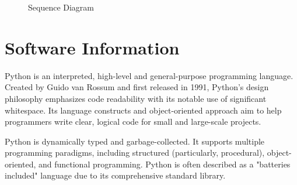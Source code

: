\documentclass[oneside,a4paper,12pt]{report}
\begin{document}
 \begin{center}
	\begin{figure}[!htbp]
		\centering
	  \caption{Sequence Diagram}
	  \label{fig:class-dig}
	\end{figure}
\end{center}

\chapter{Software Information}

Python is an interpreted, high-level and general-purpose programming language. Created by Guido van Rossum and first released in 1991, Python's design philosophy emphasizes code readability with its notable use of significant whitespace. Its language constructs and object-oriented approach aim to help programmers write clear, logical code for small and large-scale projects.

Python is dynamically typed and garbage-collected. It supports multiple programming paradigms, including structured (particularly, procedural), object-oriented, and functional programming. Python is often described as a "batteries included" language due to its comprehensive standard library.
\end{document}
